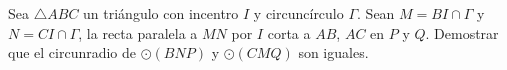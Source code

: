 Sea $\triangle ABC$ un triángulo con incentro $I$ y circuncírculo $\Gamma$. Sean $M=BI\cap \Gamma$ y $N=CI\cap \Gamma$, la recta paralela a $MN$ por $I$ corta a $AB$, $AC$ en $P$ y $Q$. Demostrar que el circunradio de $\odot (BNP)$ y $\odot (CMQ)$ son iguales.
